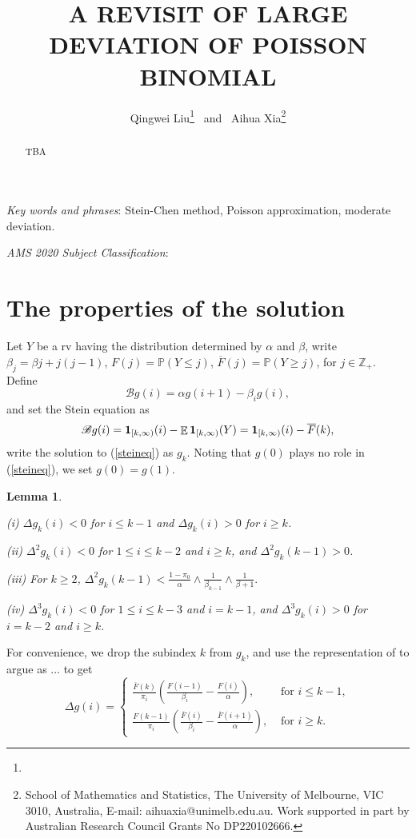 \documentclass[12pt]{article}
\title{\sc\bf\large\MakeUppercase{A revisit of large deviation of Poisson binomial}}
\author{ Qingwei Liu\footnote{}
\ and \
 Aihua Xia\footnote{School of Mathematics and Statistics,
The University of Melbourne,
VIC 3010, Australia, E-mail: aihuaxia@unimelb.edu.au. Work supported in part by Australian Research Council Grants No DP220102666.}
}
\date{\moddate}
\newtheorem{lma}[thm]{Lemma}
\def\ben#1{\begin{equation}#1\end{equation}}
\def\IP{\prob}
\newcommand{\Pro}{\mathbb{P}}
\newcommand{\prob}{\Pro}
\DeclareMathOperator{\E}{\mathbb{E}}
\newcommand{\Z}{\mathbb{Z}}
\newcommand{\bone}{{\bf 1}}
\newcommand{\scrB}{{\mathscr B}}
\def\Ref#1{(\ref{#1})}
\newcommand{\oF}{{\overline{F}}}
\newcounter{con}%
\numberwithin{equation}{section}
\begin{document}
\maketitle

\begin{abstract} TBA\end{abstract}


\vskip12pt \noindent\textit {Key words and phrases\/}: Stein-Chen method, Poisson approximation,
moderate deviation.

\vskip12pt \noindent\textit{AMS 2020 Subject Classification\/}:



\section{The properties of the solution}%

Let $Y$ be a rv having the distribution determined by $\alpha$ and $\beta$, write $\beta_j=\beta j+j(j-1)$, $F(j)=\IP(Y\le j)$, $\oF(j)=\IP(Y\ge j)$, for $j\in \Z_+$. Define 
\begin{equation}\scrB g(i)=\alpha g(i+1)-\beta_ig(i),\label{steinid}\end{equation}
and set the Stein equation as
\begin{equation}
\scrB g(i)=\bone_{[k,\infty)}(i)-\E\bone_{[k,\infty)}(Y)=\bone_{[k,\infty)}(i)-\overline{F}(k)\label{steineq},
\end{equation}
write the solution to \Ref{steineq} as $g_k$. 
Noting that $g(0)$ plays no role in \Ref{steineq}, we set $g(0)=g(1)$. 

\begin{lma}\label{lma1}

{\begin{description}
\item{(i)} $\Delta g_k(i)<0$ for $i\le k-1$ and $\Delta g_k(i)>0$ for $i\ge k$.
\item{(ii)} $\Delta^2 g_k(i)<0$ for $1\le i\le k-2$ and $i\ge k$, and $\Delta^2 g_k(k-1)>0$.
\item{(iii)} For $k\ge 2$, $\Delta^2 g_k(k-1)< \frac{1-\pi_0}{\alpha}\wedge \frac1{\beta_{k-1}}\wedge \frac1{\beta+1}.$
\item{(iv)} $\Delta^3 g_k(i)<0$ for $1\le i\le k-3$ and $i= k-1$, and $\Delta^3 g_k(i)>0$ for $i= k-2$ and $i\ge k$.
\end{description}}
\end{lma}

 For convenience, we drop the subindex $k$ from $g_k$, and use the representation of \cite{BX01} to argue as ... to get
 \ben{\label{sol1}\Delta g(i)=\begin{cases}
\frac{\oF(k)}{\pi_i}\left(\frac{F(i-1)}{\beta_i}-\frac{F(i)}{\alpha}\right),& \mbox{ for }i\le k-1,\\
\frac{F(k-1)}{\pi_i}\left(\frac{\oF(i)}{\beta_i}-\frac{\oF(i+1)}{\alpha}\right),& \mbox{ for }i\ge k.
\end{cases}}
\end{document}
